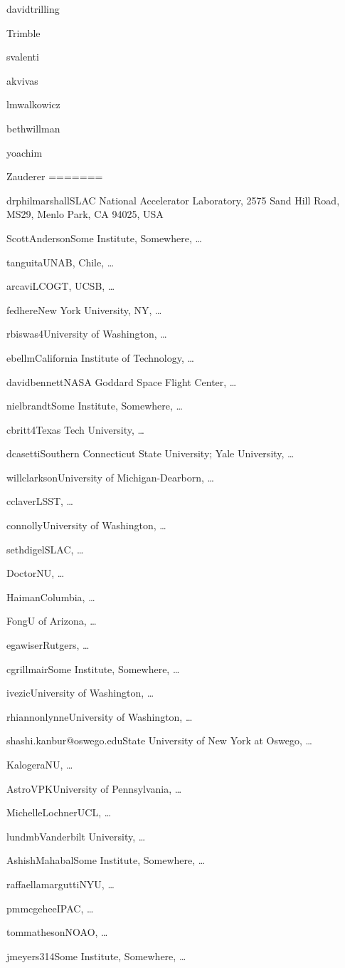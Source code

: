 \author{David Trilling}{davidtrilling}{\somewhere}
\author{Virginia Trimble}{Trimble}{\somewhere}
\author{Stefano Valenti}{svalenti}{\somewhere}
\author{Kathy Vivas}{akvivas}{\ctio}
\author{Robert Wagoner}{}{\stanford}
\author{Lucianne Walkowicz}{lmwalkowicz}{\adler}
\author{Beth Willman}{bethwillman}{\lsst}
\author{Peter Yoachim}{yoachim}{\somewhere}
\author{Bevin Ashley Zauderer}{Zauderer}{\nyu}
=======
\author{Phil Marshall}{drphilmarshall}{SLAC National Accelerator Laboratory, 2575 Sand Hill Road, MS29, Menlo Park, CA 94025, USA}
\author{Scott Anderson}{ScottAnderson}{Some Institute, Somewhere, \ldots}
\author{Timo Anguita}{tanguita}{UNAB, Chile, \ldots}
\author{Iair Arcavi}{arcavi}{LCOGT, UCSB, \ldots}
\author{Federica B. Bianco}{fedhere}{New York University, NY, \ldots}
\author{Rahul Biswas}{rbiswas4}{University of Washington, \ldots}
\author{Eric C.\ Bellm}{ebellm}{California Institute of Technology, \ldots}
\author{David Bennett}{davidbennett}{NASA Goddard Space Flight Center, \ldots}
\author{Niel Brandt}{nielbrandt}{Some Institute, Somewhere, \ldots}
\author{Chris Britt}{cbritt4}{Texas Tech University, \ldots}
\author{Dana I. Casetti-Dinescu}{dcasetti}{Southern Connecticut State University; Yale University, \ldots}
\author{Will Clarkson}{willclarkson}{University of Michigan-Dearborn, \ldots}
\author{Chuck Claver}{cclaver}{LSST, \ldots}
\author{Andy Connolly}{connolly}{University of Washington, \ldots}
\author{Seth Digel}{sethdigel}{SLAC, \ldots}
\author{Zoheyr Doctor}{Doctor}{NU, \ldots}
\author{Zoltan Haiman}{Haiman}{Columbia, \ldots}
\author{Wen-fai Fong}{Fong}{U of Arizona, \ldots}
\author{Eric Gawiser}{egawiser}{Rutgers, \ldots}
\author{Carl Grillmair}{cgrillmair}{Some Institute, Somewhere, \ldots}
\author{\v{Z}eljko Ivezi\'{c}}{ivezic}{University of Washington, \ldots}
\author{Lynne Jones}{rhiannonlynne}{University of Washington, \ldots}
\author{Shashi Kanbur}{shashi.kanbur@oswego.edu}{State University of New York at Oswego, \dots}
\author{Vassiliki Kalogera}{Kalogera}{NU, \ldots}
\author{Vishal Kasliwal}{AstroVPK}{University of Pennsylvania, \ldots}
\author{Michelle Lochner}{MichelleLochner}{UCL, \ldots}
\author{Michael B.\ Lund}{lundmb}{Vanderbilt University, \ldots}
\author{Ashish Mahabal}{AshishMahabal}{Some Institute, Somewhere, \ldots}
\author{Raffaella Margutti}{raffaellamargutti}{NYU, \ldots}
\author{Peregrine McGehee}{pmmcgehee}{IPAC, \ldots}
\author{Tom Matheson}{tommatheson}{NOAO, \ldots}
\author{Josh Meyers}{jmeyers314}{Some Institute, Somewhere, \ldots}
